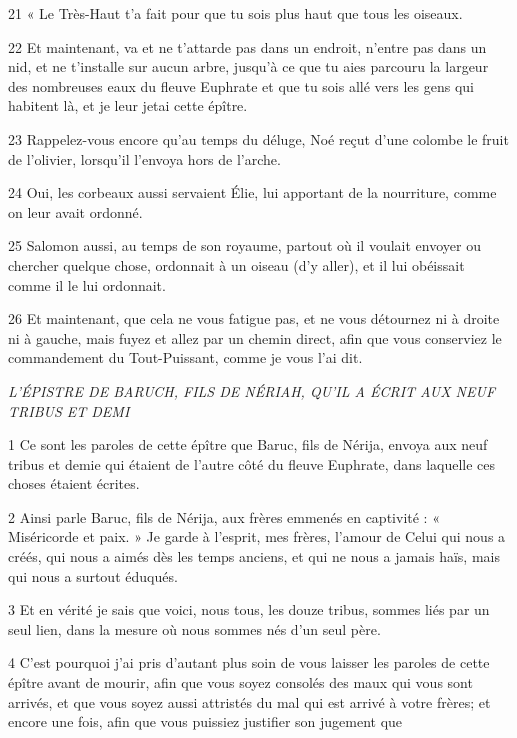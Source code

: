 \par 21 « Le Très-Haut t'a fait pour que tu sois plus haut que tous les oiseaux.

\par 22 Et maintenant, va et ne t'attarde pas dans un endroit, n'entre pas dans un nid, et ne t'installe sur aucun arbre, jusqu'à ce que tu aies parcouru la largeur des nombreuses eaux du fleuve Euphrate et que tu sois allé vers les gens qui habitent là, et je leur jetai cette épître.

\par 23 Rappelez-vous encore qu'au temps du déluge, Noé reçut d'une colombe le fruit de l'olivier, lorsqu'il l'envoya hors de l'arche.

\par 24 Oui, les corbeaux aussi servaient Élie, lui apportant de la nourriture, comme on leur avait ordonné.

\par 25 Salomon aussi, au temps de son royaume, partout où il voulait envoyer ou chercher quelque chose, ordonnait à un oiseau (d'y aller), et il lui obéissait comme il le lui ordonnait.

\par 26 Et maintenant, que cela ne vous fatigue pas, et ne vous détournez ni à droite ni à gauche, mais fuyez et allez par un chemin direct, afin que vous conserviez le commandement du Tout-Puissant, comme je vous l'ai dit.


\par \textit{L'ÉPISTRE DE BARUCH, FILS DE NÉRIAH, QU'IL A ÉCRIT AUX NEUF TRIBUS ET DEMI}

\par 1 Ce sont les paroles de cette épître que Baruc, fils de Nérija, envoya aux neuf tribus et demie qui étaient de l'autre côté du fleuve Euphrate, dans laquelle ces choses étaient écrites.

\par 2 Ainsi parle Baruc, fils de Nérija, aux frères emmenés en captivité : « Miséricorde et paix. » Je garde à l'esprit, mes frères, l'amour de Celui qui nous a créés, qui nous a aimés dès les temps anciens, et qui ne nous a jamais haïs, mais qui nous a surtout éduqués.

\par 3 Et en vérité je sais que voici, nous tous, les douze tribus, sommes liés par un seul lien, dans la mesure où nous sommes nés d'un seul père.

\par 4 C'est pourquoi j'ai pris d'autant plus soin de vous laisser les paroles de cette épître avant de mourir, afin que vous soyez consolés des maux qui vous sont arrivés, et que vous soyez aussi attristés du mal qui est arrivé à votre frères; et encore une fois, afin que vous puissiez justifier son jugement que


